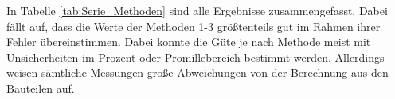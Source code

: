 \documentclass[12pt,a4paper]{article}
\begin{document}







In Tabelle \ref{tab:Serie_Methoden} sind alle Ergebnisse zusammengefasst. Dabei fällt auf, dass die Werte der Methoden 1-3 größtenteils gut im Rahmen ihrer Fehler übereinstimmen. Dabei konnte die Güte je nach Methode meist mit Unsicherheiten im Prozent oder Promillebereich bestimmt werden. Allerdings weisen sämtliche Messungen große Abweichungen von der Berechnung aus den Bauteilen auf.
\end{document}
